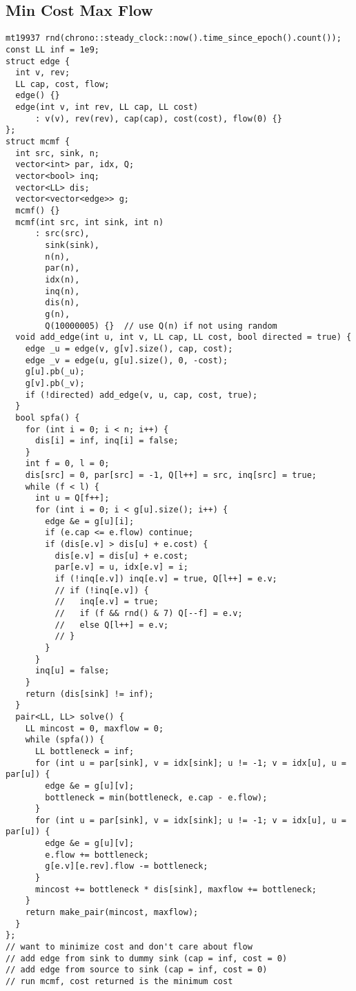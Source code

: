 \documentclass[FSZ,a4paper,onesided]{article}
\begin{document}
\begin{multicols*}{\COLS}
\subsection{Min Cost Max Flow}
\begin{lstlisting}
mt19937 rnd(chrono::steady_clock::now().time_since_epoch().count());
const LL inf = 1e9;
struct edge {
  int v, rev;
  LL cap, cost, flow;
  edge() {}
  edge(int v, int rev, LL cap, LL cost)
      : v(v), rev(rev), cap(cap), cost(cost), flow(0) {}
};
struct mcmf {
  int src, sink, n;
  vector<int> par, idx, Q;
  vector<bool> inq;
  vector<LL> dis;
  vector<vector<edge>> g;
  mcmf() {}
  mcmf(int src, int sink, int n)
      : src(src),
        sink(sink),
        n(n),
        par(n),
        idx(n),
        inq(n),
        dis(n),
        g(n),
        Q(10000005) {}  // use Q(n) if not using random
  void add_edge(int u, int v, LL cap, LL cost, bool directed = true) {
    edge _u = edge(v, g[v].size(), cap, cost);
    edge _v = edge(u, g[u].size(), 0, -cost);
    g[u].pb(_u);
    g[v].pb(_v);
    if (!directed) add_edge(v, u, cap, cost, true);
  }
  bool spfa() {
    for (int i = 0; i < n; i++) {
      dis[i] = inf, inq[i] = false;
    }
    int f = 0, l = 0;
    dis[src] = 0, par[src] = -1, Q[l++] = src, inq[src] = true;
    while (f < l) {
      int u = Q[f++];
      for (int i = 0; i < g[u].size(); i++) {
        edge &e = g[u][i];
        if (e.cap <= e.flow) continue;
        if (dis[e.v] > dis[u] + e.cost) {
          dis[e.v] = dis[u] + e.cost;
          par[e.v] = u, idx[e.v] = i;
          if (!inq[e.v]) inq[e.v] = true, Q[l++] = e.v;
          // if (!inq[e.v]) {
          //   inq[e.v] = true;
          //   if (f && rnd() & 7) Q[--f] = e.v;
          //   else Q[l++] = e.v;
          // }
        }
      }
      inq[u] = false;
    }
    return (dis[sink] != inf);
  }
  pair<LL, LL> solve() {
    LL mincost = 0, maxflow = 0;
    while (spfa()) {
      LL bottleneck = inf;
      for (int u = par[sink], v = idx[sink]; u != -1; v = idx[u], u = par[u]) {
        edge &e = g[u][v];
        bottleneck = min(bottleneck, e.cap - e.flow);
      }
      for (int u = par[sink], v = idx[sink]; u != -1; v = idx[u], u = par[u]) {
        edge &e = g[u][v];
        e.flow += bottleneck;
        g[e.v][e.rev].flow -= bottleneck;
      }
      mincost += bottleneck * dis[sink], maxflow += bottleneck;
    }
    return make_pair(mincost, maxflow);
  }
};
// want to minimize cost and don't care about flow
// add edge from sink to dummy sink (cap = inf, cost = 0)
// add edge from source to sink (cap = inf, cost = 0)
// run mcmf, cost returned is the minimum cost
\end{lstlisting}

\end{multicols*}
\end{document}
